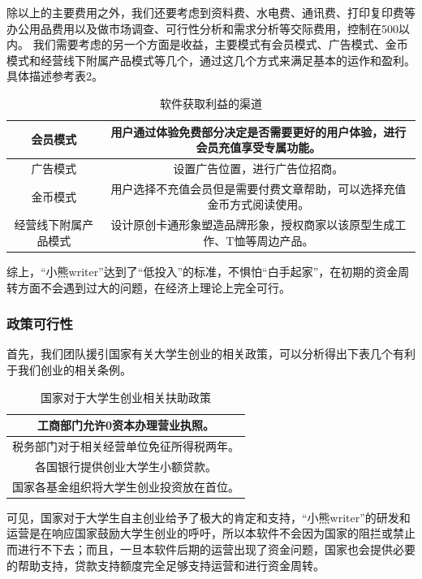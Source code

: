 \documentclass[10pt,letterpaper]{article}
\begin{document}
除以上的主要费用之外，我们还要考虑到资料费、水电费、通讯费、打印复印费等办公用品费用以及做市场调查、可行性分析和需求分析等交际费用，控制在500以内。
我们需要考虑的另一个方面是收益，主要模式有会员模式、广告模式、金币模式和经营线下附属产品模式等几个，通过这几个方式来满足基本的运作和盈利。具体描述参考表2。

\begin{table}[!htbp]
\centering
\begin{tabular}{|c|c|}
\hline
会员模式 & 用户通过体验免费部分决定是否需要更好的用户体验，进行会员充值享受专属功能。\\
\hline
广告模式 & 设置广告位置，进行广告位招商。\\
\hline
金币模式 & 用户选择不充值会员但是需要付费文章帮助，可以选择充值金币方式阅读使用。\\
\hline
经营线下附属产品模式 & 设计原创卡通形象塑造品牌形象，授权商家以该原型生成工作、T恤等周边产品。\\
\hline
\end{tabular}
\caption{软件获取利益的渠道}\label{tab:aStrangeTable}
\end{table}

综上，“小熊writer”达到了“低投入”的标准，不惧怕“白手起家”，在初期的资金周转方面不会遇到过大的问题，在经济上理论上完全可行。

\subsubsection{政策可行性}

首先，我们团队援引国家有关大学生创业的相关政策，可以分析得出下表几个有利于我们创业的相关条例。

\begin{table}[!htbp]
\centering
\begin{tabular}{|c|}
\hline
工商部门允许0资本办理营业执照。  \\
\hline
税务部门对于相关经营单位免征所得税两年。 \\
\hline
各国银行提供创业大学生小额贷款。 \\
\hline
国家各基金组织将大学生创业投资放在首位。 \\
\hline
\end{tabular}
\caption{国家对于大学生创业相关扶助政策}\label{tab:aStrangeTable}
\end{table}

可见，国家对于大学生自主创业给予了极大的肯定和支持，“小熊writer”的研发和运营是在响应国家鼓励大学生创业的呼吁，所以本软件不会因为国家的阻拦或禁止而进行不下去；而且，一旦本软件后期的运营出现了资金问题，国家也会提供必要的帮助支持，贷款支持额度完全足够支持运营和进行资金周转。
\end{document}
